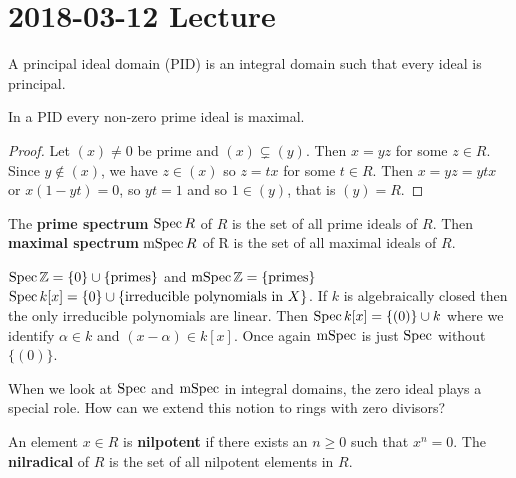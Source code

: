 \section{2018-03-12 Lecture}

\begin{defn}
	A principal ideal domain (PID) is an integral domain such that every ideal is principal.
\end{defn}

\begin{prop}[0.9]
	In a PID every non-zero prime ideal is maximal.
\end{prop}

\begin{proof}
	Let $(x) \neq 0$ be prime and $(x) \subsetneq (y)$.
	Then $x=yz$ for some $z \in R$.
	Since $y \notin (x)$, we have $z \in (x)$ so $z=tx$ for some $t \in R$.
	Then $x=yz=ytx$ or $x(1-yt)=0$, so $yt=1$ and so $1 \in (y)$, that is $(y)=R$.
\end{proof}

\begin{defn}[0.10]
	The \textbf{prime spectrum} $\operatorname{Spec} R$ of $R$ is the set of all prime ideals of $R$.
	Then \textbf{maximal spectrum} $\operatorname{mSpec} R$ of R is the set of all maximal ideals of $R$.
\end{defn}

\begin{exam}
  	\leavevmode
	\begin{enum}
		\io $\operatorname{Spec} \mathbb{Z} = \{0\} \cup \{\text{primes}\}$ and $\operatorname{mSpec} \mathbb{Z} = \{\text{primes}\}$
		\io $\operatorname{Spec} k[x] = \{0\} \cup \{\text{irreducible polynomials in }X\}$.
		\io If $k$ is algebraically closed then the only irreducible polynomials are linear.
		Then $\operatorname{Spec} k[x] = \{(0)\} \cup k$ where we identify $\alpha \in k$ and $(x-\alpha) \in k[x]$.
		Once again $\operatorname{mSpec}$ is just $\operatorname{Spec}$ without $\{(0)\}$.
	\end{enum}
\end{exam}

When we look at $\operatorname{Spec}$ and $\operatorname{mSpec}$ in integral domains, the zero ideal plays a special role.
How can we extend this notion to rings with zero divisors?

\begin{defn}[0.11]
  	\leavevmode
	\begin{enum}
		\io An element $x \in R$ is \textbf{nilpotent} if there exists an $n \geq 0$ such that $x^n=0$.
		\io The \textbf{nilradical} of $R$ is the set of all nilpotent elements in $R$.
	\end{enum}
\end{defn}

